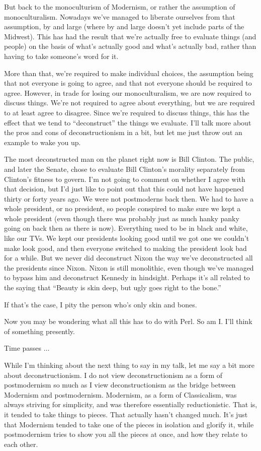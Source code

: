 But back to the monoculturism of Modernism, or rather the assumption of
monoculturalism. Nowadays we've managed to liberate ourselves from that
assumption, by and large (where by and large doesn't yet include parts of the
Midwest). This has had the result that we're actually free to evaluate things
(and people) on the basis of what's actually good and what's actually bad,
rather than having to take someone's word for it.

More than that, we're required to make individual choices, the assumption
being that not everyone is going to agree, and that not everyone should be
required to agree. However, in trade for losing our monoculturalism, we are
now required to discuss things. We're not required to agree about everything,
but we are required to at least agree to disagree. Since we're required to
discuss things, this has the effect that we tend to ``deconstruct'' the
things we evaluate. I'll talk more about the pros and cons of
deconstructionism in a bit, but let me just throw out an example to wake you
up.

The most deconstructed man on the planet right now is Bill Clinton. The
public, and later the Senate, chose to evaluate Bill Clinton's morality
separately from Clinton's fitness to govern. I'm not going to comment on
whether I agree with that decision, but I'd just like to point out that this
could not have happened thirty or forty years ago. We were not postmoderns
back then. We had to have a whole president, or no president, so 
people conspired to make sure we kept a whole president (even though there
was probably just as much hanky panky going on back then as there is now).
Everything used to be in black and white, like our TVs. We kept our
presidents looking good until we got one we couldn't make look good, and then
everyone switched to making the president look bad for a while. But we never
did deconstruct Nixon the way we've deconstructed all the presidents since
Nixon. Nixon is still monolithic, even though we've managed to bypass him and
deconstruct Kennedy in hindsight.  Perhaps it's all related to the saying
that ``Beauty is skin deep, but ugly goes right to the bone.''

If that's the case, I pity the person who's only skin and bones.

Now you may be wondering what all this has to do with Perl. So am I\hbox{}. I'll
think of something presently.

Time passes $\ldots$

While I'm thinking about the next thing to say in my talk, let me say a bit
more about deconstructionism. I do not view deconstructionism as a form of
postmodernism so much as I view deconstructionism as the bridge between
Modernism and postmodernism. Modernism, as a form of Classicalism, was always
striving for simplicity, and was therefore essentially reductionistic. That
is, it tended to take things to pieces. That actually hasn't changed much.
It's just that Modernism tended to take one of the pieces in isolation and
glorify it, while postmodernism tries to show you all the pieces at once, and
how they relate to each other.

